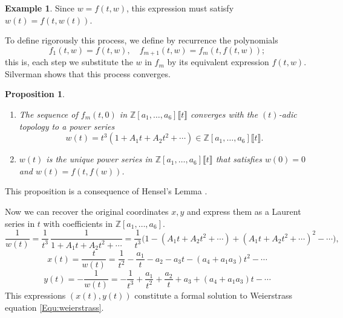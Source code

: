 \documentclass{report}
\newtheorem{proposition}[equation]{Proposition}
\theoremstyle{definition}
\newtheorem{example}[equation]{Example}
\begin{document}
\begin{example}
Since $w=f(t,w)$, this expression must satisfy $w(t)=f(t,w(t))$.

To define rigorously this process, we define by recurrence the polynomials
\[f_1(t,w)=f(t,w),\quad f_{m+1}(t,w)=f_m(t,f(t,w));\]
this is, each step we substitute the $w$ in $f_m$ by its equivalent expression $f(t,w)$. Silverman \cite[Proposition~IV.1.1]{silverman1986arithmetic} shows that this process converges.

\begin{proposition}
\begin{enumerate}[label=(\arabic*)]
\item The sequence of $f_m(t,0)$ in $\mathbb{Z}[a_1,\ldots,a_6]\llbracket t\rrbracket$ converges with the $(t)$-adic topology to a power series
\[w(t)=t^3(1+A_1t+A_2t^2+\cdots)\in\mathbb{Z}[a_1,\ldots,a_6]\llbracket t\rrbracket.\]
\item $w(t)$ is the unique power series in $\mathbb{Z}[a_1,\ldots,a_6]\llbracket t\rrbracket$ that satisfies $w(0)=0$ and $w(t)=f(t,f(w))$.
\end{enumerate}
\end{proposition}

This proposition is a consequence of Hensel's Lemma \cite[Lemma~IV.1.2]{silverman1986arithmetic}.

Now we can recover the original coordinates $x,y$ and express them as a Laurent series in $t$ with coefficients in $\mathbb{Z}[a_1,\ldots,a_6]$.
\[\frac{1}{w(t)}=\frac{1}{t^3}\,\frac{1}{1+A_1t+A_2t^2+\cdots}=\frac{1}{t^3}\big(1-(A_1t+A_2t^2+\cdots)+(A_1t+A_2t^2+\cdots)^2-\cdots\big),\]
\[x(t)=\frac{t}{w(t)}=\frac{1}{t^2}-\frac{a_1}{t}-a_2-a_3t-(a_4+a_1a_3)t^2-\cdots\]
\[y(t)=-\frac{1}{w(t)}=-\frac{1}{t^3}+\frac{a_1}{t^2}+\frac{a_2}{t}+a_3+(a_4+a_1a_3)t-\cdots\]
This expressions $(x(t),y(t))$ constitute a formal solution to Weierstrass equation \eqref{Equ:weierstrass}.


\end{example}
\end{document}
